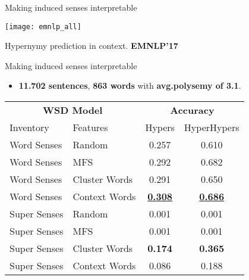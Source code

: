 \begin{frame}{ Making induced senses interpretable }

\vspace{-1em}
	\begin{center}
	\texttt{[image: emnlp\_all]}
	
	{\footnotesize Hypernymy prediction in context. \textbf{EMNLP'17}~\cite{panchenko-EtAl:2017:EMNLP2017Demos}}
	\end{center}	
	
	

	
\end{frame}



\begin{frame}{ Making induced senses interpretable }
	
	
\vspace{-1em}
	
\begin{itemize}
	\item \textbf{11.702 sentences}, \textbf{863 words} with \textbf{avg.polysemy of 3.1}.   
\end{itemize}  

\begin{center}
	
\begin{tabular}{llcc}

\multicolumn{2}{c}{\bf WSD Model} & \multicolumn{2}{c}{\bf Accuracy}  \\
Inventory & Features & Hypers &  HyperHypers  \\ \toprule

Word Senses & Random  & 0.257 & 0.610 \\
Word Senses & MFS  & 0.292 & 0.682 \\
Word Senses & Cluster Words & 0.291 & 0.650 \\
Word Senses & Context Words & \underline{\textbf{0.308}} & \underline{\textbf{0.686}} \\
\hline \pause
Super Senses & Random & 0.001 & 0.001 \\
Super Senses & MFS & 0.001 & 0.001 \\
Super Senses & Cluster Words & \textbf{0.174} & \textbf{0.365} \\
Super Senses & Context Words & 0.086 & 0.188 \\

\end{tabular}

\end{center}
	
\end{frame}

